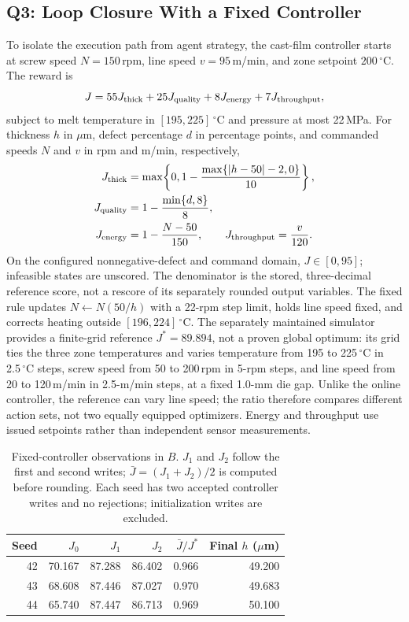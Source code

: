 \subsection{Q3: Loop Closure With a Fixed Controller}
\label{sec:clbench}
To isolate the execution path from agent strategy, the cast-film controller
starts at screw speed $N=150$\,rpm, line speed $v=95$\,m/min, and zone
setpoint $200\,^\circ$C. The reward is
\begin{equation}
J=55J_{\rm thick}+25J_{\rm quality}+8J_{\rm energy}+7J_{\rm throughput},
\label{eq:objective}
\end{equation}
subject to melt temperature in $[195,225]\,^\circ$C and pressure at most
22\,MPa. For thickness $h$ in $\mu$m, defect percentage $d$ in percentage
points, and commanded speeds $N$ and $v$ in rpm and m/min, respectively,
\begin{equation}
\begin{aligned}
J_{\rm thick}&=\max\!\left\{0,1-\frac{\max\{|h-50|-2,0\}}{10}\right\},\\
J_{\rm quality}&=1-\frac{\min\{d,8\}}{8},\\
J_{\rm energy}&=1-\frac{N-50}{150},\qquad
J_{\rm throughput}=\frac{v}{120}.
\end{aligned}
\label{eq:reward-components}
\end{equation}
On the configured nonnegative-defect and command domain, $J\in[0,95]$;
infeasible states are unscored. The denominator is the stored, three-decimal
reference score, not a rescore of its separately rounded output variables.
The fixed rule updates $N\leftarrow N(50/h)$ with a 22-rpm step limit, holds
line speed fixed, and corrects heating outside $[196,224]\,^\circ$C. The
separately maintained simulator provides a finite-grid reference
$J^*=89.894$, not a proven global optimum: its grid ties the three zone
temperatures and varies temperature from 195 to 225\,$^\circ$C in
2.5\,$^\circ$C steps, screw speed from 50 to 200\,rpm in 5-rpm steps, and line
speed from 20 to 120\,m/min in 2.5-m/min steps, at a fixed 1.0-mm die gap.
Unlike the online controller, the reference can vary line speed; the ratio
therefore compares different action sets, not two equally equipped optimizers.
Energy and throughput use issued setpoints rather than independent sensor
measurements.

\begin{table}[!t]
\centering
\caption{Fixed-controller observations in $B$. $J_1$ and $J_2$ follow the first and second writes; $\bar{J}=(J_1+J_2)/2$ is computed before rounding. Each seed has two accepted controller writes and no rejections; initialization writes are excluded.}
\label{tab:controller}
\footnotesize
\setlength{\tabcolsep}{2.5pt}
\begin{tabular}{@{}rrrrrr@{}}
\toprule
Seed & $J_0$ & $J_1$ & $J_2$ & $\bar{J}/J^*$ & Final $h$ ($\mu$m) \\
\midrule
42 & 70.167 & 87.288 & 86.402 & 0.966 & 49.200 \\
43 & 68.608 & 87.446 & 87.027 & 0.970 & 49.683 \\
44 & 65.740 & 87.447 & 86.713 & 0.969 & 50.100 \\
\bottomrule
\end{tabular}
\end{table}

